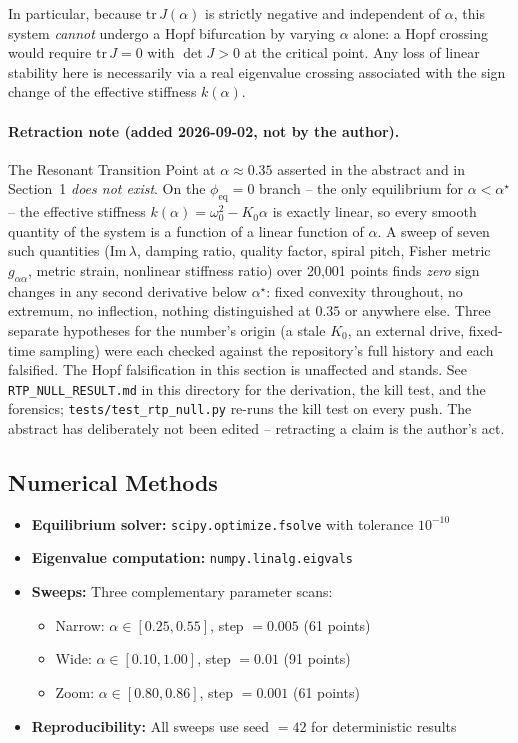 \documentclass[11pt,twocolumn]{article}
\begin{document}
In particular, because $\mathrm{tr}\,J(\alpha)$ is strictly negative and independent of $\alpha$, this system \emph{cannot} undergo a Hopf bifurcation by varying $\alpha$ alone: a Hopf crossing would require $\mathrm{tr}\,J=0$ with $\det J>0$ at the critical point. Any loss of linear stability here is necessarily via a real eigenvalue crossing associated with the sign change of the effective stiffness $k(\alpha)$.

\paragraph{Retraction note (added 2026-09-02, not by the author).}
The Resonant Transition Point at $\alpha\approx0.35$ asserted in the abstract
and in Section~1 \emph{does not exist}. On the $\phi_{\text{eq}}=0$ branch --
the only equilibrium for $\alpha<\alpha^\star$ -- the effective stiffness
$k(\alpha)=\omega_0^2-K_0\alpha$ is exactly linear, so every smooth quantity of
the system is a function of a linear function of $\alpha$. A sweep of seven such
quantities (Im$\,\lambda$, damping ratio, quality factor, spiral pitch, Fisher
metric $g_{\alpha\alpha}$, metric strain, nonlinear stiffness ratio) over
20{,}001 points finds \emph{zero} sign changes in any second derivative below
$\alpha^\star$: fixed convexity throughout, no extremum, no inflection, nothing
distinguished at $0.35$ or anywhere else. Three separate hypotheses for the
number's origin (a stale $K_0$, an external drive, fixed-time sampling) were
each checked against the repository's full history and each falsified.
The Hopf falsification in this section is unaffected and stands.
See \texttt{RTP\_NULL\_RESULT.md} in this directory for the derivation, the
kill test, and the forensics; \texttt{tests/test\_rtp\_null.py} re-runs the kill
test on every push. The abstract has deliberately not been edited --
retracting a claim is the author's act.

\subsection{Numerical Methods}

\begin{itemize}
  \item \textbf{Equilibrium solver:} \texttt{scipy.optimize.fsolve} with tolerance $10^{-10}$
  \item \textbf{Eigenvalue computation:} \texttt{numpy.linalg.eigvals}
  \item \textbf{Sweeps:} Three complementary parameter scans:
    \begin{itemize}
      \item Narrow: $\alpha \in [0.25, 0.55]$, step $= 0.005$ (61 points)
      \item Wide: $\alpha \in [0.10, 1.00]$, step $= 0.01$ (91 points)
      \item Zoom: $\alpha \in [0.80, 0.86]$, step $= 0.001$ (61 points)
    \end{itemize}
  \item \textbf{Reproducibility:} All sweeps use seed $= 42$ for deterministic results
\end{itemize}
\end{document}
